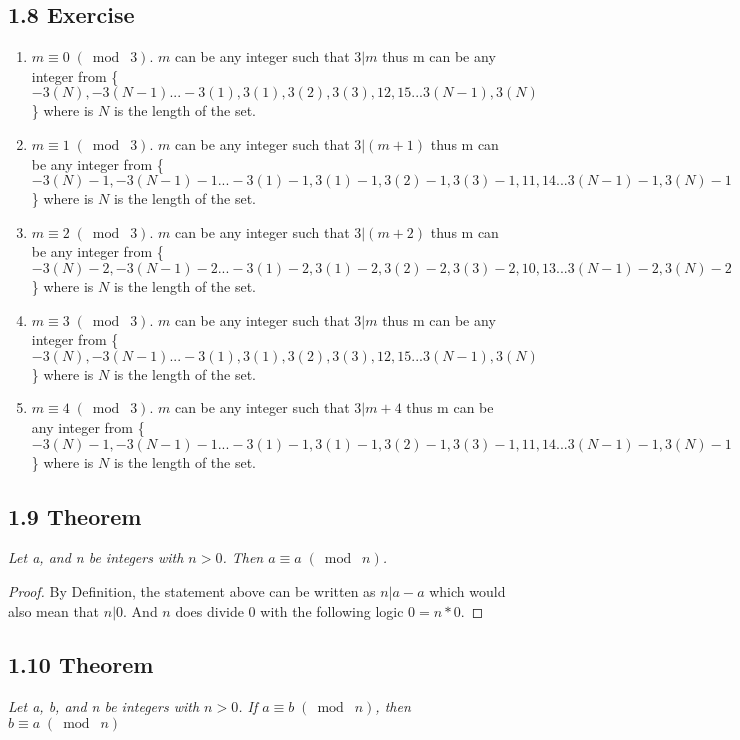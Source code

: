 \documentclass{article}
\begin{document}
\subsection*{1.8 Exercise} 
\begin{enumerate}
    \item $m \equiv 0 \;(\bmod\; 3)$.
    \newline $m$ can be any integer such that $3 \vert m$ thus m can be any integer from \{$-3(N), -3(N-1)...-3(1), 3(1),3(2),3(3),12,15...3(N-1), 3(N)$\} where is $N$ is the length of the set.
    \item $m \equiv 1 \;(\bmod\; 3)$.
    \newline $m$ can be any integer such that $3 \vert (m+1)$ thus m can be any integer from \{$-3(N)-1, -3(N-1)-1...-3(1)-1, 3(1)-1,3(2)-1,3(3)-1,11,14...3(N-1)-1, 3(N)-1$\} where is $N$ is the length of the set.
    \item $m \equiv 2 \;(\bmod\; 3)$.
    \newline $m$ can be any integer such that $3 \vert (m+2)$ thus m can be any integer from \{$-3(N)-2, -3(N-1)-2...-3(1)-2, 3(1)-2,3(2)-2,3(3)-2,10,13...3(N-1)-2, 3(N)-2$\} where is $N$ is the length of the set.
    \item $m \equiv 3 \;(\bmod\; 3)$.
    \newline $m$ can be any integer such that $3 \vert m$ thus m can be any integer from \{$-3(N), -3(N-1)...-3(1), 3(1),3(2),3(3),12,15...3(N-1), 3(N)$\} where is $N$ is the length of the set.
    \item $m \equiv 4 \;(\bmod\; 3)$.
    \newline $m$ can be any integer such that $3 \vert m+4$ thus m can be any integer from \{$-3(N)-1, -3(N-1)-1...-3(1)-1, 3(1)-1,3(2)-1,3(3)-1,11,14...3(N-1)-1, 3(N)-1$\} where is $N$ is the length of the set.
\end{enumerate}

\subsection*{1.9 Theorem} 
\quad \textit{Let a, and n be integers with $n > 0$. Then $a \equiv a \;(\bmod\; n)$.}

\begin{proof}
By Definition, the statement above can be written as $n \vert a-a$ which would also mean that $n \vert 0$. And $n$ does divide $0$ with the following logic $0 = n * 0$.
\end{proof}

\subsection*{1.10 Theorem} 
\quad \textit{Let a, b, and n be integers with $n > 0$. If $a \equiv b \;(\bmod\; n)$, then $b \equiv a \;(\bmod\; n)$}
\end{document}

